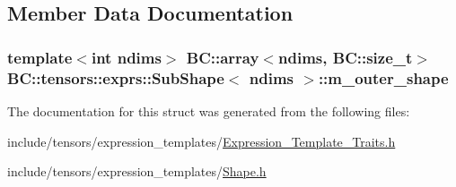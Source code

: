 \subsection{Member Data Documentation}
\subsubsection[{\texorpdfstring{m\+\_\+outer\+\_\+shape}{m_outer_shape}}]{\setlength{\rightskip}{0pt plus 5cm}template$<$int ndims$>$ {\bf B\+C\+::array}$<$ndims, {\bf B\+C\+::size\+\_\+t}$>$ {\bf B\+C\+::tensors\+::exprs\+::\+Sub\+Shape}$<$ ndims $>$\+::m\+\_\+outer\+\_\+shape}\hypertarget{classBC_1_1tensors_1_1exprs_1_1SubShape_aecebfe667cd43408f9c94b633b2f3a9d}{}\label{classBC_1_1tensors_1_1exprs_1_1SubShape_aecebfe667cd43408f9c94b633b2f3a9d}


The documentation for this struct was generated from the following files\+:\begin{DoxyCompactItemize}
\item 
include/tensors/expression\+\_\+templates/\hyperlink{Expression__Template__Traits_8h}{Expression\+\_\+\+Template\+\_\+\+Traits.\+h}\item 
include/tensors/expression\+\_\+templates/\hyperlink{Shape_8h}{Shape.\+h}\end{DoxyCompactItemize}
